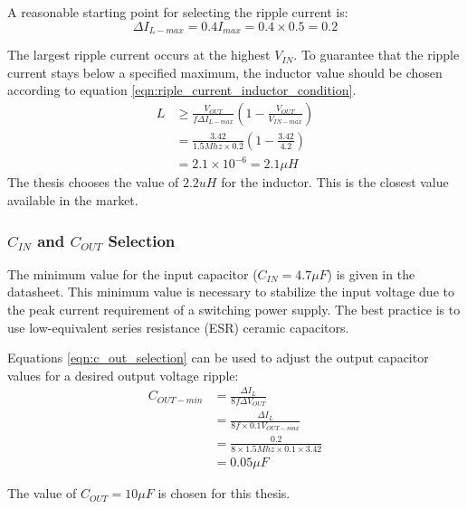 \documentclass[\main/main.tex]{subfiles}
\begin{document}
A reasonable starting point for selecting the ripple current
is:
\begin{equation}
    \Delta I_{L-max} = 0.4 I_{max} = 0.4 \times 0.5 = 0.2
\end{equation}

The largest ripple current occurs at the highest $V_{IN}$. To guarantee that the ripple current stays below a specified maximum, the inductor value should be chosen according to equation \ref{eqn:riple_current_inductor_condition}.
\begin{equation}
    \begin{split}
        L &\geq \frac{V_{OUT}}{f\Delta I_{L-max}} \left( 1 - \frac{V_{OUT}}{V_{IN-max}}\right)  \\
        &= \frac{3.42}{1.5Mhz \times 0.2} \left( 1 - \frac{3.42}{4.2}\right) \\
        &= 2.1 \times 10^{-6} = 2.1 \mu H
    \end{split}
    \label{eqn:riple_current_inductor_condition}
\end{equation}
The thesis chooses the value of $2.2uH$ for the inductor. This is the closest value available in the market.

\subsubsection{$C_{IN}$ and $C_{OUT}$ Selection}
The minimum value for the input capacitor ($C_{IN} = 4.7 \mu F$) is given in the datasheet. This minimum value is necessary to stabilize the input voltage due to the peak current requirement of a switching power supply.
The best practice is to use low-equivalent series resistance (ESR) ceramic capacitors. 

Equations \ref{eqn:c_out_selection} can be used to adjust the output capacitor values for a desired output voltage ripple:
\begin{equation}
    \begin{split}
        C_{OUT-min} &= \frac{\Delta I_{L}}{8f\Delta V_{OUT}} \\
        &= \frac{\Delta I_{L}}{8f \times 0.1V_{OUT-max}} \\
        &= \frac{0.2}{8 \times 1.5Mhz \times 0.1 \times 3.42} \\
        &= 0.05 \mu F
    \end{split}
    \label{eqn:c_out_selection}
\end{equation}

The value of $C_{OUT} = 10\mu F$ is chosen for this thesis.
\end{document}
